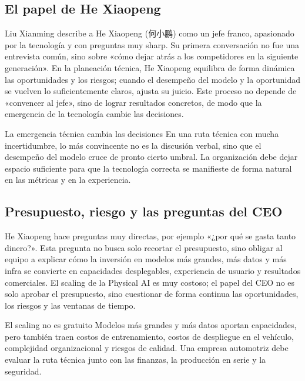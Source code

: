 \documentclass[a4paper]{article}
\begin{document}
\subsection{El papel de He Xiaopeng}

Liu Xianming describe a He Xiaopeng (何小鹏) como un jefe franco, apasionado por la tecnología y con preguntas muy sharp. Su primera conversación no fue una entrevista común, sino sobre «cómo dejar atrás a los competidores en la siguiente generación». En la planeación técnica, He Xiaopeng equilibra de forma dinámica las oportunidades y los riesgos; cuando el desempeño del modelo y la oportunidad se vuelven lo suficientemente claros, ajusta su juicio. Este proceso no depende de «convencer al jefe», sino de lograr resultados concretos, de modo que la emergencia de la tecnología cambie las decisiones.

\begin{importantbox}{La emergencia técnica cambia las decisiones}
En una ruta técnica con mucha incertidumbre, lo más convincente no es la discusión verbal, sino que el desempeño del modelo cruce de pronto cierto umbral. La organización debe dejar espacio suficiente para que la tecnología correcta se manifieste de forma natural en las métricas y en la experiencia.
\end{importantbox}

\subsection{Presupuesto, riesgo y las preguntas del CEO}

He Xiaopeng hace preguntas muy directas, por ejemplo «¿por qué se gasta tanto dinero?». Esta pregunta no busca solo recortar el presupuesto, sino obligar al equipo a explicar cómo la inversión en modelos más grandes, más datos y más infra se convierte en capacidades desplegables, experiencia de usuario y resultados comerciales. El scaling de la Physical AI es muy costoso; el papel del CEO no es solo aprobar el presupuesto, sino cuestionar de forma continua las oportunidades, los riesgos y las ventanas de tiempo.

\begin{warningbox}{El scaling no es gratuito}
Modelos más grandes y más datos aportan capacidades, pero también traen costos de entrenamiento, costos de despliegue en el vehículo, complejidad organizacional y riesgos de calidad. Una empresa automotriz debe evaluar la ruta técnica junto con las finanzas, la producción en serie y la seguridad.
\end{warningbox}
\end{document}
